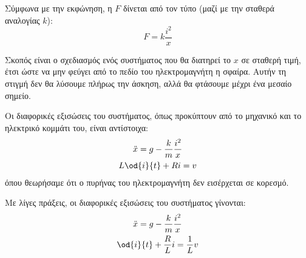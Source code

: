 \documentclass[11pt,a4paper,notitlepage,fleqn]{article}
\begin{document}
\begin{exercise}

	Σύμφωνα με την εκφώνηση, η \( F \) δίνεται από τον τύπο (μαζί με την
	σταθερά αναλογίας \( k \)):
	\[
	F = k\frac{i^2}{x}
	\]

	Σκοπός είναι ο σχεδιασμός ενός συστήματος που θα διατηρεί το \( x \)
	σε σταθερή τιμή, έτσι ώστε να μην φεύγει από το πεδίο του ηλεκτρομαγνήτη
	η σφαίρα. Αυτήν τη στιγμή δεν θα λύσουμε πλήρως την άσκηση, αλλά θα
	φτάσουμε μέχρι ένα μεσαίο σημείο.

	Οι διαφορικές εξισώσεις του συστήματος, όπως προκύπτουν από το
	μηχανικό και το ηλεκτρικό κομμάτι του, είναι αντίστοιχα:
	\begin{gather*}
		\ddot x = g - \frac{k}{m}\frac{i^2}{x} \\
		L\od{i}{t} + Ri = v
	\end{gather*}
	όπου θεωρήσαμε ότι ο πυρήνας του ηλεκτρομαγνήτη δεν εισέρχεται σε
	κορεσμό.

	Με λίγες πράξεις, οι διαφορικές εξισώσεις του συστήματος γίνονται:
	\begin{gather}
		\ddot x = g -\frac{k}{m}\frac{i^2}{x}
		\label{eq:sec4ex2a} \\
		\od{i}{t} + \frac{R}{L}i = \frac{1}{L} v
		\label{eq:sec4ex2b}
	\end{gather}


\end{exercise}
\end{document}
